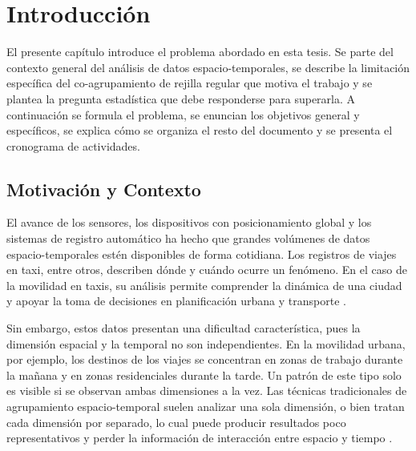 
\chapter{Introducción}
\label{chap:introduccion}

El presente capítulo introduce el problema abordado en esta tesis. Se parte
del contexto general del análisis de datos espacio-temporales, se describe
la limitación específica del co-agrupamiento de rejilla regular que motiva
el trabajo y se plantea la pregunta estadística que debe responderse para
superarla. A continuación se formula el problema, se enuncian los objetivos
general y específicos, se explica cómo se organiza el resto del documento y
se presenta el cronograma de actividades.

\section{Motivación y Contexto}
\label{sec:motivacion}

El avance de los sensores, los dispositivos con posicionamiento global y
los sistemas de registro automático ha hecho que grandes volúmenes de datos
espacio-temporales estén disponibles de forma cotidiana. Los registros de
viajes en taxi, entre otros, describen dónde y cuándo ocurre un fenómeno.
En el caso de la movilidad en taxis, su análisis permite comprender la
dinámica de una ciudad y apoyar la toma de decisiones en planificación
urbana y transporte \citep{Liu2021}.

Sin embargo, estos datos presentan una dificultad característica, pues la
dimensión espacial y la temporal no son independientes. En la movilidad
urbana, por ejemplo, los destinos de los viajes se concentran en zonas de
trabajo durante la mañana y en zonas residenciales durante la tarde. Un
patrón de este tipo solo es visible si se observan ambas dimensiones a la
vez. Las técnicas tradicionales de agrupamiento espacio-temporal suelen
analizar una sola dimensión, o bien tratan cada dimensión por separado, lo
cual puede producir resultados poco representativos y perder la información
de interacción entre espacio y tiempo \citep{Liu2021}.


